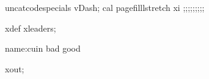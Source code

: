 uncatcodespecials vDash;
cal pagefilllstretch xi ;;;;;;;;;

xdef xleaders;


{name}:cuin
{bad}
{good}

xout;